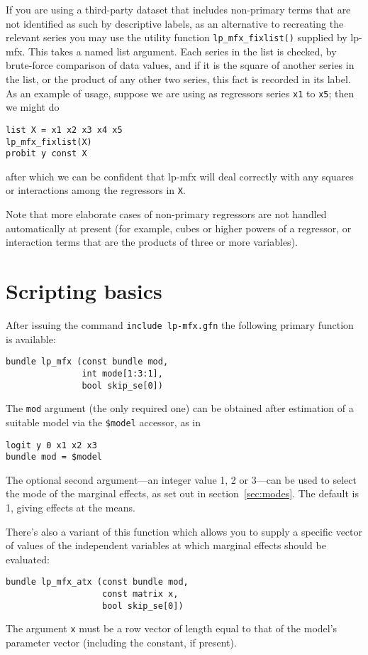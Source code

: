 \documentclass{article}
\begin{document}
If you are using a third-party dataset that includes non-primary terms
that are not identified as such by descriptive labels, as an
alternative to recreating the relevant series you may use the utility
function \texttt{lp\_mfx\_fixlist()} supplied by \textsf{lp-mfx}.
This takes a named list argument.  Each series in the list is checked,
by brute-force comparison of data values, and if it is the square of
another series in the list, or the product of any other two series,
this fact is recorded in its label. As an example of usage, suppose we
are using as regressors series \texttt{x1} to \texttt{x5}; then we
might do
\begin{verbatim}
list X = x1 x2 x3 x4 x5
lp_mfx_fixlist(X)
probit y const X
\end{verbatim}
after which we can be confident that \textsf{lp-mfx} will deal
correctly with any squares or interactions among the regressors in
\texttt{X}.

Note that more elaborate cases of non-primary regressors are not
handled automatically at present (for example, cubes or higher powers
of a regressor, or interaction terms that are the products of three or
more variables).

\section{Scripting basics}
\label{sec:script-usage}

After issuing the command \texttt{include lp-mfx.gfn} the following
primary function is available:
\begin{verbatim}
bundle lp_mfx (const bundle mod,
               int mode[1:3:1],
               bool skip_se[0])
\end{verbatim}
The \texttt{mod} argument (the only required one) can be obtained
after estimation of a suitable model via the
\verb|$model| accessor, as in
\begin{verbatim}
logit y 0 x1 x2 x3
bundle mod = $model
\end{verbatim}
The optional second argument---an integer value 1, 2 or 3---can be
used to select the mode of the marginal effects, as set out in
section~\ref{sec:modes}. The default is 1, giving effects at the
means.

There's also a variant of this function which allows you to supply a
specific vector of values of the independent variables at which
marginal effects should be evaluated:
\begin{verbatim}
bundle lp_mfx_atx (const bundle mod,
                   const matrix x,
                   bool skip_se[0])
\end{verbatim}
The argument \texttt{x} must be a row vector of length equal to that
of the model's parameter vector (including the constant, if present).
\end{document}
